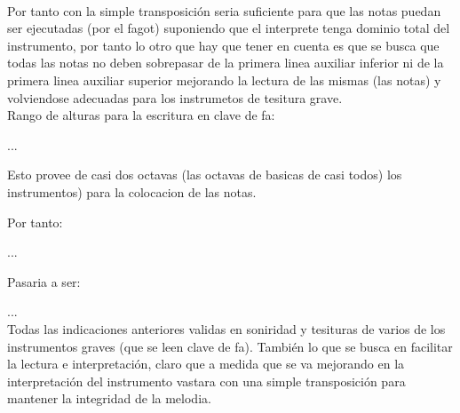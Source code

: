 \documentclass[11pt,letterpaper,oneside]{article}
\begin{document}
	{%
\parindent 0pt
\noindent
\ifx\preLilyPondExample \undefined
\else
  \expandafter\preLilyPondExample
\fi
\def\lilypondbook{}%

\ifx\postLilyPondExample \undefined
\else
  \expandafter\postLilyPondExample
\fi
}\\
  
	Por tanto con la simple transposici\'on seria suficiente para que las
	notas puedan ser ejecutadas (por el fagot) suponiendo que el interprete
	tenga dominio total del instrumento, por tanto lo otro que hay que tener
	en cuenta es que se busca que todas las notas no deben sobrepasar de
	la primera linea auxiliar inferior ni de la primera linea auxiliar superior
	mejorando la lectura de las mismas (las notas) y volviendose adecuadas
	para los instrumetos de tesitura grave.\\
	
	Rango de alturas para la escritura en clave de fa:
	
	{%
\parindent 0pt
\noindent
\ifx\preLilyPondExample \undefined
\else
  \expandafter\preLilyPondExample
\fi
\def\lilypondbook{}%

\ifx\postLilyPondExample \undefined
\else
  \expandafter\postLilyPondExample
\fi
} ...
	
	Esto provee de casi dos octavas (las octavas de basicas de casi todos)
	los instrumentos) para la colocacion de las notas.
	
	Por tanto:
	
	{%
\parindent 0pt
\noindent
\ifx\preLilyPondExample \undefined
\else
  \expandafter\preLilyPondExample
\fi
\def\lilypondbook{}%

\ifx\postLilyPondExample \undefined
\else
  \expandafter\postLilyPondExample
\fi
} ...
	
	Pasaria a ser:
	
	{%
\parindent 0pt
\noindent
\ifx\preLilyPondExample \undefined
\else
  \expandafter\preLilyPondExample
\fi
\def\lilypondbook{}%

\ifx\postLilyPondExample \undefined
\else
  \expandafter\postLilyPondExample
\fi
} ...\\
	
	Todas las indicaciones anteriores validas en soniridad y tesituras de
	varios de los instrumentos graves (que se leen clave de fa). Tambi\'en
	lo que se busca en facilitar la lectura e interpretaci\'on, claro que 
	a medida que se va mejorando en la interpretaci\'on del instrumento
	vastara con una simple transposici\'on para mantener la integridad
	de la melodia.\\
\end{document}
